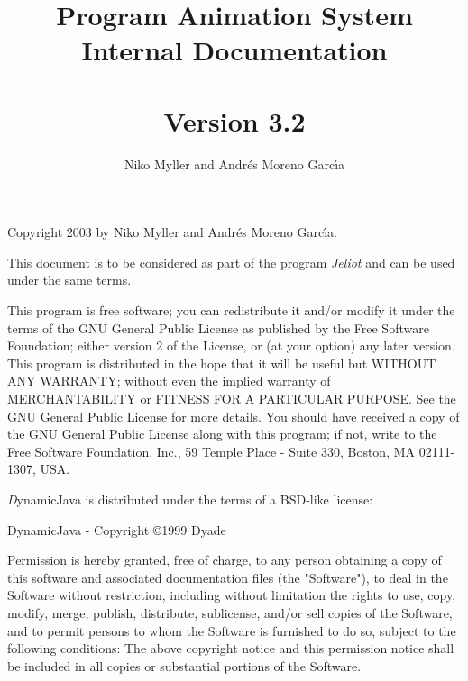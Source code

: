 \documentclass[a4paper, 12pt]{article}
\title{\jel{} Program Animation System\\Internal Documentation\\\mbox{}\\\large{Version 3.2}}
\author{Niko Myller and Andr\'{e}s Moreno Garc\'{\i}a}
\newcommand{\jel}{Jeliot}
\newcommand{\djava}{DynamicJava}
\begin{document}

\maketitle
\thispagestyle{empty}

%
%
%
%
%
%
%
%
%
%

\newpage

\thispagestyle{empty} %
\vfil
Copyright 2003 by Niko Myller and Andr\'{e}s Moreno Garc\'{\i}a.
\bigskip

This document is to be considered as part of the program
\emph{\jel} and can be used under the same terms.
\bigskip

{\small
This program is free software; you can redistribute it and/or
modify it under the terms of the GNU General Public License
as published by the Free Software Foundation; either version 2
of the License, or (at your option) any later version.
This program is distributed in the hope that it will be useful
but WITHOUT ANY WARRANTY; without even the implied warranty of
MERCHANTABILITY or FITNESS FOR A PARTICULAR PURPOSE.
See the GNU General Public License for more details.
You should have received a copy of the GNU General Public License
along with this program; if not, write to the Free Software
Foundation, Inc., 59 Temple Place - Suite 330, Boston, MA
02111-1307, USA.
}

{\emph \djava{}} is distributed under the terms of a BSD-like license:

\djava{} - Copyright \copyright 1999 Dyade

{\small Permission is hereby granted, free of charge, to any person
obtaining a copy of this software and associated documentation
files (the "Software"), to deal in the Software without restriction,
including without limitation the rights to use, copy, modify, merge,
publish, distribute, sublicense, and/or sell copies of the Software,
and to permit persons to whom the Software is furnished to do so,
subject to the following conditions: The above copyright notice and
this permission notice shall be included in all copies or substantial
portions of the Software. }
\end{document}
